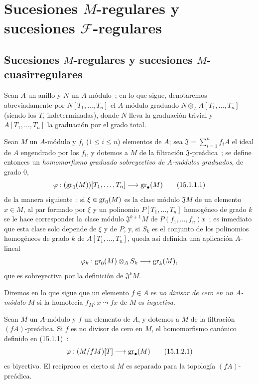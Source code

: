 \section{Sucesiones \texorpdfstring{$M$}{M}-regulares y sucesiones
\texorpdfstring{$\mathscr F$}{F}-regulares}
\label{section:0.15-fr}

\subsection{Sucesiones \texorpdfstring{$M$}{M}-regulares y sucesiones
\texorpdfstring{$M$}{M}-cuasirregulares}
\label{subsection:0.15.1-fr}
\label{0.15.1-fr}

\begin{env}[15.1.1]
\label{0.15.1.1-fr}

Sean $A$ un anillo y $N$ un $A$-módulo~; en lo que sigue, denotaremos
abreviadamente por $N[T_1,\ldots,T_n]$ el $A$-módulo graduado
$N\otimes_A A[T_1,\ldots,T_n]$ (siendo los $T_i$ indeterminadas), donde $N$
lleva la graduación trivial y $A[T_1,\ldots,T_n]$ la graduación por el grado total.

Sean $M$ un $A$-módulo y $f_i$ ($1\leq i\leq n$) elementos de $A$;
sea $\mathfrak{J}=\sum_{i=1}^n f_iA$ el ideal de $A$ engendrado por los $f_i$,
y dotemos a $M$ de la filtración $\mathfrak{J}$-preádica~; se define entonces un
\emph{homomorfismo graduado sobreyectivo de $A$-módulos graduados}, de grado $0$,
\[
  \varphi : (\operatorname{gr}_0(M))[T_1,\ldots,T_n]\longrightarrow\operatorname{gr}_\bullet(M)
  \tag{15.1.1.1}\label{0.15.1.1.1-fr}
\]
de la manera siguiente~: si $\xi\in\operatorname{gr}_0(M)$ es la clase módulo
$\mathfrak{J}M$ de un elemento $x\in M$, al par formado por $\xi$ y un
polinomio $P[T_1,\ldots,T_n]$ homogéneo de grado $k$ se le hace corresponder la
clase módulo $\mathfrak{J}^{k+1}M$ de $P(f_1,\ldots,f_n)x$~; es inmediato
que esta clase
solo depende de $\xi$ y de $P$, y, si $S_k$ es el conjunto de los polinomios
homogéneos de grado $k$ de $A[T_1,\ldots,T_n]$, queda así definida una
aplicación $A$-lineal
\[
  \varphi_k:\operatorname{gr}_0(M)\otimes_A S_k\longrightarrow\operatorname{gr}_k(M),
\]
que es sobreyectiva por la definición de $\mathfrak{J}^kM$.

Diremos en lo que sigue que un elemento $f\in A$ es \emph{no divisor de
cero en un $A$-módulo $M$} si la homotecia $f_M:x\leadsto fx$ de $M$ es
\emph{inyectiva}.
\end{env}

\begin{lemma}[15.1.2]
\label{0.15.1.2-fr}
Sean $M$ un $A$-módulo y $f$ un elemento de $A$, y dotemos a $M$ de la
filtración $(fA)$-preádica. Si $f$ es no divisor de cero en $M$,
el homomorfismo canónico definido en (15.1.1)~:
\[
  \varphi:(M/fM)[T]\longrightarrow\operatorname{gr}_\bullet(M)
  \tag{15.1.2.1}\label{0.15.1.2.1-fr}
\]
es biyectivo. El recíproco es cierto si $M$ es separado para la topología
$(fA)$-preádica.
\end{lemma}

